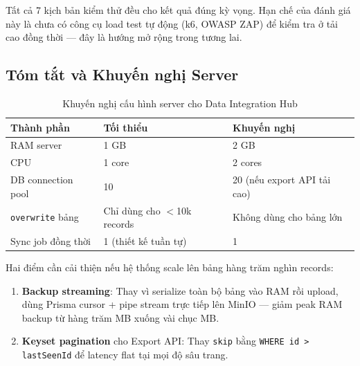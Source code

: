 Tất cả 7 kịch bản kiểm thử đều cho kết quả đúng kỳ vọng. Hạn chế
của đánh giá này là chưa có công cụ load test tự động (k6, OWASP ZAP)
để kiểm tra ở tải cao đồng thời — đây là hướng mở rộng trong tương lai.

\subsection{Tóm tắt và Khuyến nghị Server}
\label{sec:perf-summary}

\begin{table}[H]
\centering
\caption{Khuyến nghị cấu hình server cho Data Integration Hub}
\label{tab:server-recommendation}
\begin{tabular}{lll}
\toprule
\textbf{Thành phần} & \textbf{Tối thiểu} & \textbf{Khuyến nghị} \\
\midrule
RAM server              & 1 GB  & 2 GB \\
CPU                     & 1 core & 2 cores \\
DB connection pool      & 10    & 20 (nếu export API tải cao) \\
\texttt{overwrite} bảng & Chỉ dùng cho $<$10k records &
  Không dùng cho bảng lớn \\
Sync job đồng thời      & 1 (thiết kế tuần tự) & 1 \\
\bottomrule
\end{tabular}
\end{table}

Hai điểm cần cải thiện nếu hệ thống scale lên bảng hàng trăm nghìn
records:
\begin{enumerate}
  \item \textbf{Backup streaming}: Thay vì serialize toàn bộ bảng
        vào RAM rồi upload, dùng Prisma cursor + pipe stream trực
        tiếp lên MinIO — giảm peak RAM backup từ hàng trăm MB
        xuống vài chục MB.
  \item \textbf{Keyset pagination} cho Export API: Thay \texttt{skip}
        bằng \texttt{WHERE id > lastSeenId} để latency flat tại
        mọi độ sâu trang.
\end{enumerate}
